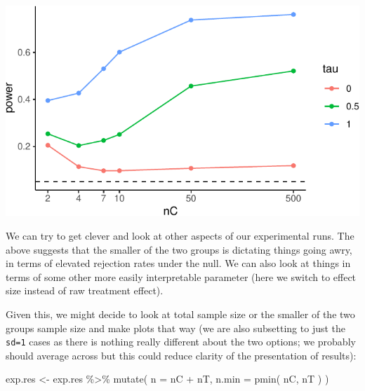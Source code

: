 \documentclass[
]{book}
\newenvironment{Shaded}{\begin{snugshade}}{\end{snugshade}}
\newcommand{\AttributeTok}[1]{\textcolor[rgb]{0.77,0.63,0.00}{#1}}
\newcommand{\FunctionTok}[1]{\textcolor[rgb]{0.00,0.00,0.00}{#1}}
\newcommand{\NormalTok}[1]{#1}
\newcommand{\OtherTok}[1]{\textcolor[rgb]{0.56,0.35,0.01}{#1}}
\newcommand{\SpecialCharTok}[1]{\textcolor[rgb]{0.00,0.00,0.00}{#1}}
\begin{document}
\begin{center}\includegraphics[width=0.75\linewidth]{Designing-Simulations-in-R_files/figure-latex/plotCollapse-1} \end{center}

We can try to get clever and look at other aspects of our experimental runs.
The above suggests that the smaller of the two groups is dictating things
going awry, in terms of elevated rejection rates under the null. We can also
look at things in terms of some other more easily interpretable parameter
(here we switch to effect size instead of raw treatment effect).

Given this, we might decide to look at total sample size or the smaller of
the two groups sample size and make plots that way (we are also subsetting to
just the \texttt{sd=1} cases as there is nothing really different about the two
options; we probably should average across but this could reduce clarity of
the presentation of results):

\begin{Shaded}
\begin{Highlighting}[]
\NormalTok{exp.res }\OtherTok{\textless{}{-}}\NormalTok{ exp.res }\SpecialCharTok{\%\textgreater{}\%} \FunctionTok{mutate}\NormalTok{( }\AttributeTok{n =}\NormalTok{ nC }\SpecialCharTok{+}\NormalTok{ nT,}
                               \AttributeTok{n.min =} \FunctionTok{pmin}\NormalTok{( nC, nT ) )}
\end{Highlighting}
\end{Shaded}
\end{document}
